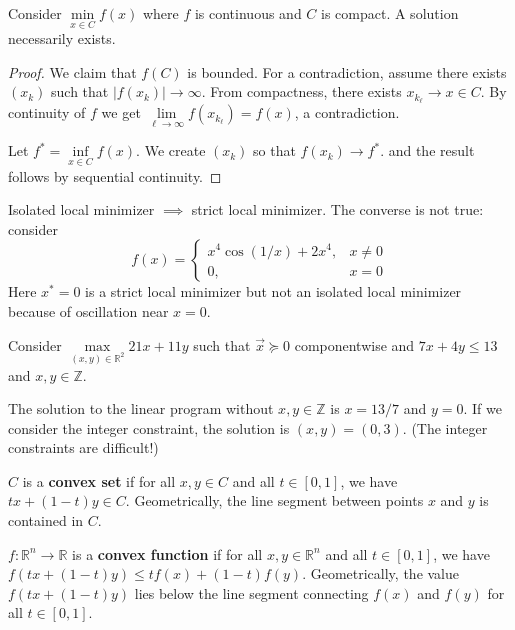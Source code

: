 \documentclass[english, 11pt]{article}
\begin{document}
\begin{thrm}
Consider $\min \limits_{x \in C} f(x)$ where $f$ is continuous and $C$ is compact. A solution necessarily exists.
\end{thrm}
\begin{proof}
We claim that $f(C)$ is bounded. For a contradiction, assume there exists $(x_k)$ such that $|f(x_k)| \to \infty$. From compactness, there exists $x_{k_{\ell}} \to x \in C$. By continuity of $f$ we get $\lim \limits_{\ell \to \infty} f(x_{k_\ell}) = f(x)$, a contradiction.

Let $f^* = \inf \limits_{x \in C} f(x)$. We create $(x_k)$ so that $f(x_k) \to f^*$. and the result follows by sequential continuity.
\end{proof}


\begin{exmp}
Isolated local minimizer $\implies$ strict local minimizer. The converse is not true: consider 
\[
f(x) = \begin{cases} 
x^4 \cos(1/x) + 2x^4, & x \neq 0 \\ 0, & x=0 \end{cases}
\]
Here $x^*=0$ is a strict local minimizer but not an isolated local minimizer because of oscillation near $x=0$.
\end{exmp}

\begin{exmp}
Consider $\max \limits_{(x,y) \in \mathbb{R}^2} 21x + 11 y$ such that $\vec x \succeq 0$ componentwise and $7x+4y \le 13$ and $x,y \in \mathbb{Z}$.

The solution to the linear program without $x,y \in \mathbb{Z}$ is $x=13/7$ and $y=0$. If we consider the integer constraint, the solution is $(x,y) = (0,3)$. (The integer constraints are difficult!)
\end{exmp} 

\begin{defn}
$C$ is a {\bf convex set} if for all $x,y \in C$ and all $t \in [0,1]$, we have $tx + (1-t) y \in C$. Geometrically, the line segment between points $x$ and $y$ is contained in $C$.
\end{defn}

\begin{defn}
$f:\mathbb{R}^n \to \mathbb{R}$ is a {\bf convex function} if for all $x,y \in \mathbb{R}^n$ and all $t \in [0,1]$, we have $f( tx + (1-t) y) \le t f(x) + (1-t) f(y)$. Geometrically, the value $f( tx + (1-t) y)$ lies below the line segment connecting $f(x)$ and $f(y)$ for all $t \in [0,1]$.
\end{defn}
\end{document}
